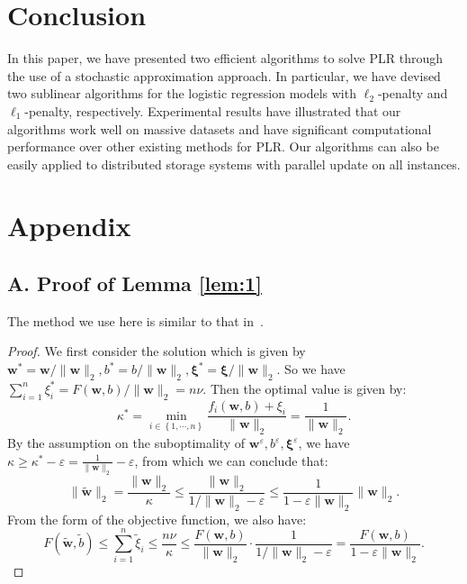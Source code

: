\documentclass{llncs}
\newcommand{\bw}{\mathbf{w}}
\newcommand{\bwep}{\mathbf{w}^{\varepsilon}}
\newcommand{\bwfly}{\tilde{\mathbf{w}}}
\newcommand{\bxi}{\mathbf{\xi}}
\newcommand{\lc}{\left(}
\newcommand{\rc}{\right)}
\begin{document}
\section{Conclusion} \label{sec:concl}

In this paper, we have presented two efficient algorithms to solve PLR through the use of a stochastic approximation approach.
In particular, we have devised two sublinear algorithms for the logistic regression models with $\ell_2$-penalty and $\ell_1$-penalty, respectively.
Experimental results have illustrated that our algorithms work well on massive datasets and have significant computational performance over other existing methods for PLR.
Our algorithms can also be easily applied to distributed storage systems with parallel update on all instances.

\section*{Appendix}

\subsection*{A. Proof of Lemma \ref{lem:1} }
The method we use here is similar to that in~\cite{hazanbeating}.
\begin{proof}
	We first consider the solution which is given by $\bw^*=\bw /\|\bw\|_2,b^*=b/\|\bw\|_2,\bxi^*=\bxi/\|\bw\|_2$. So we have $ \sum_{i=1}^n \xi_i^* =F\lc\bw,b\rc/\|\bw\|_2=n\nu$.
	Then the optimal value is given by:
	\[
	\kappa^*=\min_{i\in\left\{1,\cdots,n\right\}} \frac{f_i(\bw,b)+\xi_i}{\|\bw\|_2}=\frac{1}{\|\bw\|_2}.
	\]
	By the assumption on the suboptimality of $\bwep,b^{\varepsilon},\bxi^\varepsilon$, we have $ \kappa \geq \kappa^* -\varepsilon= \frac{1}{\|\bw\|_2} -\varepsilon$, from which we can conclude that:
	\[
	\|\bwfly\|_2=\frac{\|\bw\|_2}{\kappa} \leq \frac{\|\bw\|_2}{1/\|\bw\|_2-\varepsilon} \leq \frac{1}{1-\varepsilon\|\bw\|_2}\|\bw\|_2.
	\]
	From the form of the objective function, we also have:
	\[
	F\lc\bwfly,\tilde{b}\rc \leq \sum_{i=1}^n \tilde{\xi}_i \leq \frac{n\nu}{\kappa} \leq \frac{F\lc\bw,b\rc}{\|\bw\|_2}\cdot\frac{1}{1/\|\bw\|_2-\varepsilon}=\frac{F\lc\bw,b\rc}{1-\varepsilon\|\bw\|_2}.
	\]
	
\end{proof}
\end{document}
